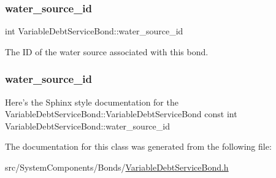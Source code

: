 \subsubsection{\texorpdfstring{water\+\_\+source\+\_\+id}{water\_source\_id}\hspace{0.1cm}{\footnotesize\ttfamily [1/2]}}
{\footnotesize\ttfamily int Variable\+Debt\+Service\+Bond\+::water\+\_\+source\+\_\+id\hspace{0.3cm}{\ttfamily [private]}}



The ID of the water source associated with this bond. 

\mbox{\label{classVariableDebtServiceBond_a1b43195523e5571e04f2ed558497ab6a}} 
\subsubsection{\texorpdfstring{water\+\_\+source\+\_\+id}{water\_source\_id}\hspace{0.1cm}{\footnotesize\ttfamily [2/2]}}
{\footnotesize\ttfamily Here’s the Sphinx style documentation for the Variable\+Debt\+Service\+Bond\+::\+Variable\+Debt\+Service\+Bond const int Variable\+Debt\+Service\+Bond\+::water\+\_\+source\+\_\+id}



The documentation for this class was generated from the following file\+:\begin{DoxyCompactItemize}
\item 
src/\+System\+Components/\+Bonds/\mbox{\hyperlink{VariableDebtServiceBond_8h}{Variable\+Debt\+Service\+Bond.\+h}}\end{DoxyCompactItemize}

